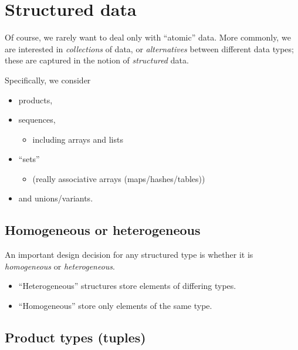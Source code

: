 \documentclass[11pt]{article}
\theoremstyle{definition}
\begin{document}
\section{Structured data}
\label{sec:orgc4aaf9e}

Of course, we rarely want to deal only with “atomic” data.
More commonly, we are interested in \emph{collections} of data,
or \emph{alternatives} between different data types;
these are captured in the notion of \emph{structured} data.

Specifically, we consider
\begin{itemize}
\item products,
\item sequences,
\begin{itemize}
\item including arrays and lists
\end{itemize}
\item “sets”
\begin{itemize}
\item (really associative arrays (maps/hashes/tables))
\end{itemize}
\item and unions/variants.
\end{itemize}

\subsection{Homogeneous or heterogeneous}
\label{sec:org69bfe2b}

An important design decision for any structured type
is whether it is \emph{homogeneous} or \emph{heterogeneous}.
\begin{itemize}
\item “Heterogeneous” structures store elements of differing types.
\item “Homogeneous” store only elements of the same type.
\end{itemize}

\subsection{Product types (tuples)}
\label{sec:org5d65879}
\end{document}

